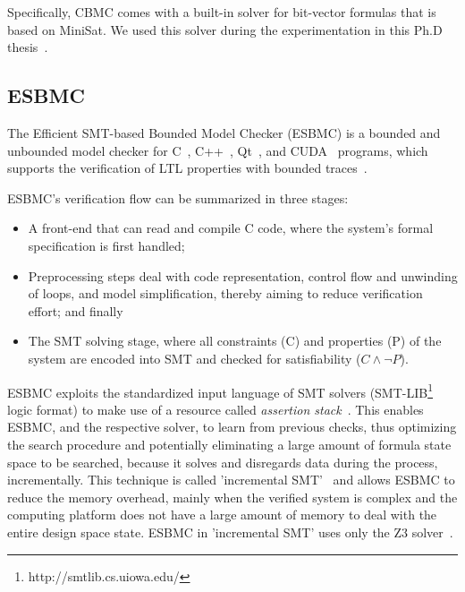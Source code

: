 Specifically, CBMC comes with a built-in solver for bit-vector formulas that is based on MiniSat. We used this solver during the experimentation in this Ph.D thesis~\cite{Kroening}.

\subsection{ESBMC}
\label{sec:ESBMC}

The Efficient SMT-based Bounded Model Checker (ESBMC) is a bounded and unbounded model checker for C~\cite{esbmc2018,GadelhaMCN19}, C++~\cite{RamalhoFSMC013}, Qt~\cite{MonteiroGCF17}, and CUDA~\cite{PereiraASMMFC17} programs, which supports the verification of LTL properties with bounded traces~\cite{DBLP:journals/sosym/MorseCN015}. 

ESBMC's verification flow can be summarized in three stages: 

\begin{itemize}
\item A front-end that can read and compile C code, where the system's formal specification is first handled; 
\item Preprocessing steps deal with code representation, control flow and unwinding of loops, and model simplification, thereby aiming to reduce verification effort; and finally 
\item The SMT solving stage, where all constraints (C) and properties (P) of the system are encoded into SMT and checked for satisfiability ($C \wedge \neg P$).
\end{itemize}
 
ESBMC exploits the standardized input language of SMT solvers (SMT-LIB\footnote{http://smtlib.cs.uiowa.edu/} logic format) to make use of a resource called \textit{assertion stack}~\cite{Morse2015}. This enables ESBMC, and the respective solver, to learn from previous checks, thus optimizing the search procedure and potentially eliminating a large amount of formula state space to be searched, because it solves and disregards data during the process, incrementally. This technique is called 'incremental SMT'~\cite{DBLP:journals/fac/SchrammelKBMTB17} and allows ESBMC to reduce the memory overhead, mainly when the verified system is complex and the computing platform does not have a large amount of memory to deal with the entire design space state. ESBMC in 'incremental SMT' uses only the Z3 solver~\cite{DeMoura}.

